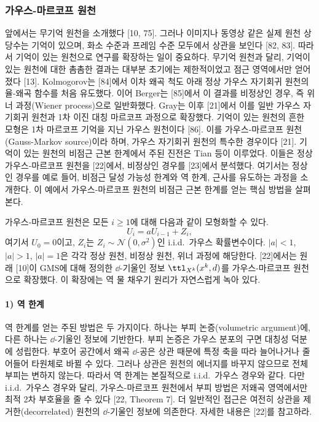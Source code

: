 \subsubsection{가우스-마르코프 원천}

앞에서는 무기억 원천을 소개했다 [10, 75].
그러나 이미지나 동영상 같은 실제 원천 상당수는 기억이 있으며, 화소 수준과 프레임 수준 모두에서 상관을 보인다 [82, 83].
따라서 기억이 있는 원천으로 연구를 확장하는 일이 중요하다.
무기억 원천과 달리, 기억이 있는 원천에 대한 촘촘한 결과는 대부분 초기에는 제한적이었고 점근 영역에서만 얻어졌다 [13].
Kolmogorov는 [84]에서 이차 왜곡 척도 아래 정상 가우스 자기회귀 원천의 율-왜곡 함수를 처음 유도했다.
이어 Berger는 [85]에서 이 결과를 비정상인 경우, 즉 위너 과정(Wiener process)으로 일반화했다.
Gray는 이후 [21]에서 이를 일반 가우스 자기회귀 원천과 1차 이진 대칭 마르코프 과정으로 확장했다.
기억이 있는 원천의 흔한 모형은 1차 마르코프 기억을 지닌 가우스 원천이다 [86].
이를 가우스-마르코프 원천(Gauss-Markov source)이라 하며, 가우스 자기회귀 원천의 특수한 경우이다 [21].
기억이 있는 원천의 비점근 근본 한계에서 주된 진전은 Tian 등이 이루었다.
이들은 정상 가우스-마르코프 원천을 [22]에서, 비정상인 경우를 [23]에서 분석했다.
여기서는 정상인 경우를 예로 들어, 비점근 달성 가능성 한계와 역 한계, 근사를 유도하는 과정을 소개한다.
이 예에서 가우스-마르코프 원천의 비점근 근본 한계를 얻는 핵심 방법을 살펴본다.

가우스-마르코프 원천은 모든 $i\ge 1$에 대해 다음과 같이 모형화할 수 있다.
\begin{equation}
  U_i = aU_{i-1} + Z_i,
  \tag{12}
\end{equation}
여기서 $U_0=0$이고, $Z_i$는 $Z_i\sim\mathcal{N}(0,\sigma^2)$인 i.i.d.\ 가우스 확률변수이다.
$|a|<1$, $|a|>1$, $|a|=1$은 각각 정상 원천, 비정상 원천, 위너 과정에 해당한다.
[22]에서는 원래 [10]이 GMS에 대해 정의한 $\dd$-기울인 정보 $\ttl_{X^k}(x^k,d)$를 가우스-마르코프 원천으로 확장했다. 이 확장에는 역 물 채우기 원리가 자연스럽게 녹아 있다.

\paragraph{1) 역 한계}
역 한계를 얻는 주된 방법은 두 가지이다.
하나는 부피 논증(volumetric argument)에, 다른 하나는 $\dd$-기울인 정보에 기반한다.
부피 논증은 가우스 분포의 구면 대칭성 덕분에 성립한다.
부호어 공간에서 왜곡 $\dd$-공은 상관 때문에 특정 축을 따라 늘어나거나 줄어들어 타원체로 바뀔 수 있다.
그러나 상관은 원천의 에너지를 바꾸지 않으므로 전체 부피는 변하지 않는다.
따라서 역 한계는 본질적으로 i.i.d.\ 가우스 경우와 같다.
다만 i.i.d.\ 가우스 경우와 달리, 가우스-마르코프 원천에서 부피 방법은 저왜곡 영역에서만 최적 2차 부호율을 줄 수 있다 [22, Theorem 7].
더 일반적인 접근은 여전히 상관을 제거한(decorrelated) 원천의 $\dd$-기울인 정보에 의존한다. 자세한 내용은 [22]를 참고하라.


